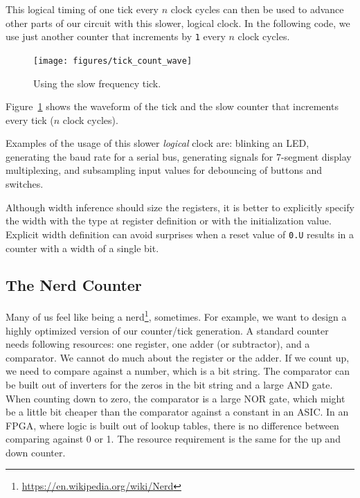 \documentclass[%
    10pt,
    headinclude, footexclude,
    openright, %
    notitlepage,
    cleardoubleempty,
    headsepline,
    pointlessnumbers,
    bibtotoc, idxtotoc,
    ]{scrbook}
\newcommand{\code}[1]{{\small{\texttt{#1}}}}
\newcommand{\myref}[2]{\href{#1}{#2}}
\renewcommand{\myref}[2]{{#2}{\footnote{\url{#1}}}}
\begin{document}

\noindent This logical timing of one tick every $n$ clock cycles can then be used
to advance other parts of our circuit with this slower, logical clock.
In the following code, we use just another counter that increments by \code{1}
every $n$ clock cycles.


\begin{figure}
  \centering
  \texttt{[image: figures/tick\_count\_wave]}
  \caption{Using the slow frequency tick.}
  \label{fig:tick-count-wave}
\end{figure}

\noindent Figure~\ref{fig:tick-count-wave} shows the waveform of the tick and the
slow counter that increments every tick ($n$ clock cycles).

Examples of the usage of this slower \emph{logical} clock are: blinking an LED,
generating the baud rate for a serial bus, generating signals for 7-segment
display multiplexing, and subsampling input values for debouncing of buttons
and switches. 

Although width inference should size the registers, it is better to explicitly
specify the width with the type at register definition or with the
initialization value. Explicit width definition can avoid surprises when a reset value of \code{0.U}
results in a counter with a width of a single bit.

\subsection{The Nerd Counter}

Many of us feel like being a \myref{https://en.wikipedia.org/wiki/Nerd}{nerd}, sometimes.
For example, we want to design a highly optimized version of our counter/tick generation.
A standard counter needs following resources: one register, one adder (or subtractor),
and a comparator. We cannot do much about the register or the adder. If we count
up, we need to compare against a number, which is a bit string. The comparator
can be built out of inverters for the zeros in the bit string and a large AND gate.
When counting down to zero, the comparator is a large NOR gate, which might be
a little bit cheaper than the comparator against a constant in an ASIC.
In an FPGA, where logic is built out of lookup tables, there is no difference between comparing
against 0 or 1. The resource requirement is the same for the up and down counter.
\end{document}
